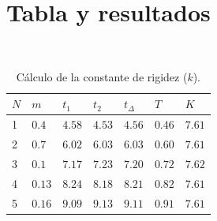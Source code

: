 \section{Tabla y resultados}
\begin{table}[H]
	\centering
	\parbox{10cm}{%
		\caption{Cálculo de la constante de rigidez ($k$).}\label{tab:03}}\\
	\begin{tabular}{C{0.5cm}C{1cm}C{1cm}C{1cm}C{1cm}C{1cm}C{1cm}}
		\hline
		$N$ & $m$    & $t_1$  & $t_2$  & $t_\Delta$ & $T$    & $K$    \\
		                     & $0.4$  & $4.58$ & $4.53$ & $4.56$     & $0.46$ & $7.61$ \\
		2                     & $0.7$  & $6.02$ & $6.03$ & $6.03$     & $0.60$ & $7.61$ \\
		3                     & $0.1$  & $7.17$ & $7.23$ & $7.20$     & $0.72$ & $7.62$ \\
		4                     & $0.13$ & $8.24$ & $8.18$ & $8.21$     & $0.82$ & $7.61$ \\
		5                     & $0.16$ & $9.09$ & $9.13$ & $9.11$     & $0.91$ & $7.61$ \\
		\midrule
	\end{tabular}
\end{table}
